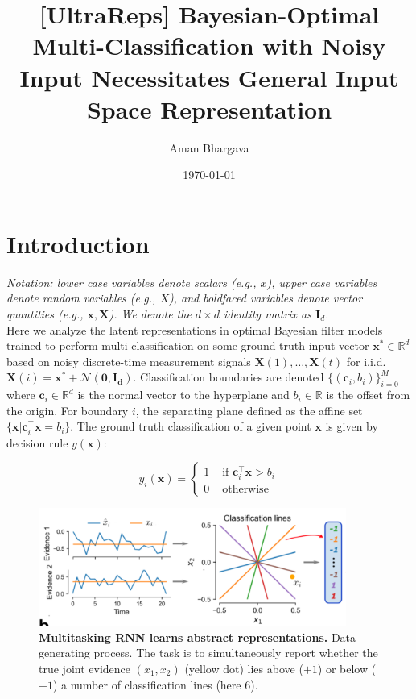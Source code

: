 \documentclass[12pt]{article}
\begin{document}
\title{[UltraReps] Bayesian-Optimal Multi-Classification with Noisy Input Necessitates General Input Space Representation}

\author{Aman Bhargava}

\date{\today}
\maketitle

\section{Introduction}
\label{sec:intro}
\textit{Notation: lower case variables denote scalars (e.g., $x$), upper case variables denote random variables (e.g., $X$), and boldfaced variables denote vector quantities (e.g., $\mathbf x, \mathbf X$). 
We denote the $d\times d$ identity matrix as $\mathbf I_d$.} \\

Here we analyze the latent representations in optimal Bayesian filter models trained to perform multi-classification on some ground truth input vector $\mathbf x^* \in \mathbb R^d$ based on noisy discrete-time measurement signals $\mathbf X(1), \dots, \mathbf X(t)$ for i.i.d. $\mathbf X(i) = \mathbf x^* + \mathcal N(\mathbf{0, I_d})$. Classification boundaries are denoted $\{(\mathbf c_i, b_i)\}_{i = 0}^M$ where $\mathbf c_i \in \mathbb R^d$ is the normal vector to the hyperplane and $b_i\in \mathbb R$ is the offset from the origin. 
For boundary $i$, the separating plane defined as the affine set $\{\mathbf x | \mathbf c_i^\top \mathbf x = b_i\}$. 
The ground truth classification of a given point $\mathbf x$ is given by decision rule $y(\mathbf x)$: 

\begin{equation}
	\label{def:decision_rule}
	y_i(\mathbf x) = \begin{cases}
		1 & \text{ if } \mathbf c_i^\top \mathbf x > b_i \\ 
		0 & \text{ otherwise } 
	\end{cases}
\end{equation}



\begin{figure}[h! tbp]
	\centering 
	\includegraphics[width=0.9\textwidth]{media/multitask_fig2a.png}
	\caption[Multitasking RNN learns abstract representations]{\textbf{Multitasking RNN learns abstract representations. } Data generating process. The task is to simultaneously report whether the true joint evidence $(x_1,x_2)$ (yellow dot) lies above ($+1$) or below ($-1$) a number of classification lines (here 6).}
	\label{fig:2a}
\end{figure}
\end{document}
